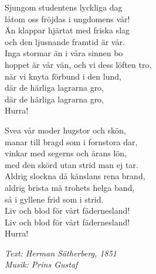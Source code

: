 \vspace{10pt}
Sjungom studentens lyckliga dag\\
låtom oss fröjdas i ungdomens vår!\\
Än klappar hjärtat med friska slag\\
och den ljusnande framtid är vår.\\
Inga stormar än i våra sinnen bo\\
hoppet är vår vän, och vi dess löften tro,\\
när vi knyta förbund i den lund,\\
där de härliga lagrarna gro,\\
där de härliga lagrarna gro,\\
Hurra!\par
\vspace{10pt}
Svea vår moder hugstor och skön,\\
manar till bragd som i fornstora dar,\\
vinkar med segerns och ärans lön,\\
med den skörd utan strid man ej tar.\\
Aldrig slockna då känslans rena brand,\\
aldrig brista må trohets helga band,\\
så i gyllene frid som i strid.\\
Liv och blod för vårt fädernesland!\\
Liv och blod för vårt fädernesland!\\
Hurra!\par
\vspace{10pt}
{\footnotesize\textit{Text: Herman Sätherberg, 1851}}\\
{\footnotesize\textit{Musik: Prins Gustaf}}
